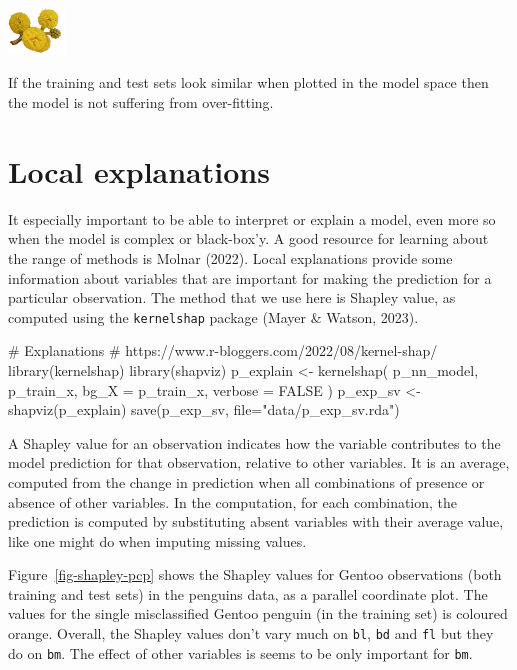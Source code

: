 \documentclass[
  letterpaper,
]{krantz}
\newenvironment{Shaded}{\begin{snugshade}}{\end{snugshade}}
\newcommand{\AttributeTok}[1]{\textcolor[rgb]{0.40,0.45,0.13}{#1}}
\newcommand{\CommentTok}[1]{\textcolor[rgb]{0.37,0.37,0.37}{#1}}
\newcommand{\ConstantTok}[1]{\textcolor[rgb]{0.56,0.35,0.01}{#1}}
\newcommand{\FunctionTok}[1]{\textcolor[rgb]{0.28,0.35,0.67}{#1}}
\newcommand{\NormalTok}[1]{\textcolor[rgb]{0.00,0.23,0.31}{#1}}
\newcommand{\OtherTok}[1]{\textcolor[rgb]{0.00,0.23,0.31}{#1}}
\newcommand{\StringTok}[1]{\textcolor[rgb]{0.13,0.47,0.30}{#1}}
\newcommand{\infobox}[1]{%
\noindent\colorbox{info!30}{%
\begin{minipage}{0.98\linewidth}%
    \centering%
    \begin{minipage}[c]{0.15\linewidth} %
      \includegraphics[width=1.5cm]{images/mulga-flowers2.png} %
    \end{minipage}%
    \hfill %
    \begin{minipage}[c]{0.8\linewidth} %
      \bigskip%
      \textsf{#1}%
      \bigskip%
    \end{minipage}%
    \hspace*{3mm}%
  \end{minipage}%
}%
}
\begin{document}
\infobox{If the training and test sets look similar when plotted in the model space then the model is not suffering from over-fitting. 
}

\section{Local explanations}\label{local-explanations}

 

It especially important to be able to interpret or explain a model, even
more so when the model is complex or black-box'y. A good resource for
learning about the range of methods is Molnar (2022). Local explanations
provide some information about variables that are important for making
the prediction for a particular observation. The method that we use here
is Shapley value, as computed using the \texttt{kernelshap} package
(Mayer \& Watson, 2023).

\begin{Shaded}
\begin{Highlighting}[]
\CommentTok{\# Explanations}
\CommentTok{\# https://www.r{-}bloggers.com/2022/08/kernel{-}shap/}
\FunctionTok{library}\NormalTok{(kernelshap)}
\FunctionTok{library}\NormalTok{(shapviz)}
\NormalTok{p\_explain }\OtherTok{\textless{}{-}} \FunctionTok{kernelshap}\NormalTok{(}
\NormalTok{    p\_nn\_model,}
\NormalTok{    p\_train\_x, }
    \AttributeTok{bg\_X =}\NormalTok{ p\_train\_x,}
    \AttributeTok{verbose =} \ConstantTok{FALSE}
\NormalTok{  )}
\NormalTok{p\_exp\_sv }\OtherTok{\textless{}{-}} \FunctionTok{shapviz}\NormalTok{(p\_explain)}
\FunctionTok{save}\NormalTok{(p\_exp\_sv, }\AttributeTok{file=}\StringTok{"data/p\_exp\_sv.rda"}\NormalTok{)}
\end{Highlighting}
\end{Shaded}

A Shapley value for an observation indicates how the variable
contributes to the model prediction for that observation, relative to
other variables. It is an average, computed from the change in
prediction when all combinations of presence or absence of other
variables. In the computation, for each combination, the prediction is
computed by substituting absent variables with their average value, like
one might do when imputing missing values.

Figure~\ref{fig-shapley-pcp} shows the Shapley values for Gentoo
observations (both training and test sets) in the penguins data, as a
parallel coordinate plot. The values for the single misclassified Gentoo
penguin (in the training set) is coloured orange. Overall, the Shapley
values don't vary much on \texttt{bl}, \texttt{bd} and \texttt{fl} but
they do on \texttt{bm}. The effect of other variables is seems to be
only important for \texttt{bm}.
\end{document}
